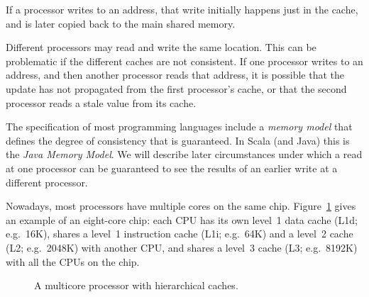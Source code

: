 If a processor writes to an address, that write initially happens just in the
cache, and is later copied back to the main shared memory.

Different processors may read and write the same location.  This can be
problematic if the different caches are not consistent.  If one processor
writes to an address, and then another processor reads that address, it is
possible that the update has not propagated from the first processor's cache,
or that the second processor reads a stale value from its cache.  

The specification of most programming languages include a \emph{memory model}
that defines the degree of consistency that is guaranteed.  In Scala (and
Java) this is the \emph{Java Memory Model}.  We will describe later
circumstances under which a read at one processor can be guaranteed to see the
results of an earlier write at a different processor.



Nowadays, most processors have multiple cores on the same chip.
Figure~\ref{fig:multicore} gives an example of an eight-core chip: each CPU
has its own level~1 data cache (L1d; e.g.~16K), shares a level~1 instruction
cache (L1i; e.g.~64K) and a level~2 cache (L2; e.g.~2048K) with another CPU,
and shares a level~3 cache (L3; e.g.~8192K) with all the CPUs on the chip.


\begin{figure}
\begin{center}
\end{center}
\caption{A multicore processor with hierarchical caches.}
\label{fig:multicore}
\end{figure}

